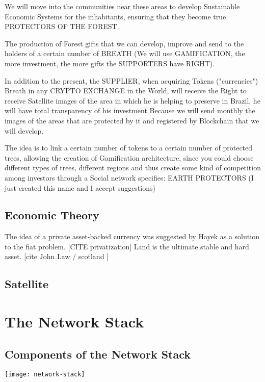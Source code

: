 \documentclass{article}
\begin{document}
We will move into the communities near these areas to develop Sustainable Economic Systems for the inhabitants, ensuring that they become true PROTECTORS OF THE FOREST.

The production of Forest gifts that we can develop, improve and send to the holders of a certain number of BREATH (We will use GAMIFICATION, the more investment, the more gifts the SUPPORTERS have RIGHT).

In addition to the present, the SUPPLIER, when acquiring Tokens ("currencies") Breath in any CRYPTO EXCHANGE  in the World, will receive the Right to receive Satellite images of the area in which he is helping to preserve in Brazil, he will have total transparency of his investment Because we will send monthly the images of the areas that are protected by it and registered by Blockchain that we will develop.

The idea is to link a certain number of tokens to a certain number of protected trees, allowing the creation of Gamification architecture, since you could choose different types of trees, different regions and thus create some kind of competition among investors through a Social network specifies: EARTH PROTECTORS (I just created this name and I accept suggestions)

\subsection{Economic Theory}

The idea of a private asset-backed currency was suggested by Hayek as a solution to the fiat problem. [CITE privatization] Land is the ultimate stable and hard asset. [cite John Law / scotland ]


\subsection{Satellite}




\section{The Network Stack}

\subsection {Components of the Network Stack}

\texttt{[image: network-stack]}
\end{document}
